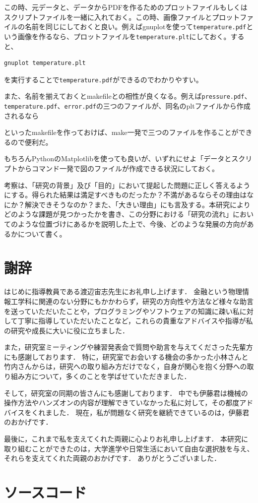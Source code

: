 \documentclass[titlepage]{jsreport}
\begin{document}
この時、元データと、データからPDFを作るためのプロットファイルもしくはスクリプトファイルを一緒に入れておく。この時、画像ファイルとプロットファイルの名前を同じにしておくと良い。例えばgnuplotを使って\verb|temperature.pdf|という画像を作るなら、プロットファイルを\verb|temperature.plt|にしておく。すると、

\begin{lstlisting}[language=bash]
gnuplot temperature.plt
\end{lstlisting}

を実行することで\verb|temperature.pdf|ができるのでわかりやすい。

また、名前を揃えておくとmakefileとの相性が良くなる。例えば\verb|pressure.pdf|、\verb|temperature.pdf|、\verb|error.pdf|の三つのファイルが、同名のpltファイルから作成されるなら



といったmakefileを作っておけば、make一発で三つのファイルを作ることができるので便利だ。

もちろんPythonのMatplotlibを使っても良いが、いずれにせよ「データとスクリプトからコマンド一発で図のファイルが作成できる状況にしておく。

考察は、「研究の背景」及び「目的」において提起した問題に正しく答えるようにする。得られた結果は満足すべきものだったか？不満があるならその理由はなにか？解決できそうなのか？また、「大きい理由」にも言及する。本研究によりどのような課題が見つかったかを書き、この分野における「研究の流れ」においてのような位置づけにあるかを説明した上で、今後、どのような発展の方向があるかについて書く。

\chapter*{謝辞}
はじめに指導教員である渡辺宙志先生にお礼申し上げます．
金融という物理情報工学科に関連のない分野にもかかわらず，研究の方向性や方法など様々な助言を送っていただいたことや，プログラミングやソフトウェアの知識に疎い私に対して丁寧に指導していただいたことなど，これらの貴重なアドバイスや指導が私の研究や成長に大いに役に立ちました．


また，研究室ミーティングや練習発表会で質問や助言を与えてくださった先輩方にも感謝しております．
特に，研究室でお会いする機会の多かった小林さんと竹内さんからは，研究への取り組み方だけでなく，自身が関心を抱く分野への取り組み方について，多くのことを学ばせていただきました．

そして，研究室の同期の皆さんにも感謝しております．
中でも伊藤君は機械の操作方法やハンズオンの内容が理解できていなかった私に対して，その都度アドバイスをくれました．
現在，私が問題なく研究を継続できているのは，伊藤君のおかげです．

最後に，これまで私を支えてくれた両親に心よりお礼申し上げます．
本研究に取り組むことができたのは，大学進学や日常生活において自由な選択肢を与え、それらを支えてくれた両親のおかげです．
ありがとうございました．

\appendix

\chapter{ソースコード}





\end{document}
